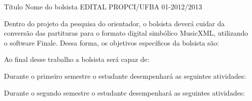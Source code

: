 \documentclass[11pt]{article}
\begin{document}

\dadosBolsista
{Título}
{Nome do bolsista}
{EDITAL PROPCI/UFBA 01-2012/2013}

\newpage


Dentro do projeto da pesquisa do orientador, o bolsista deverá cuidar
da conversão das partituras para o formato digital simbólico MusicXML,
utilizando o software Finale. Dessa forma, os objetivos específicos da
bolsista são:

\begin{enumerate}
\end{enumerate}


Ao final desse trabalho a bolsista será capaz de:

\begin{enumerate}
\end{enumerate}


Durante o primeiro semestre o estudante desempenhará as seguintes
atividades:

\begin{enumerate}
\end{enumerate}

Durante o segundo semestre o estudante desempenhará as seguintes
atividades:

\begin{enumerate}
\end{enumerate}
\end{document}
